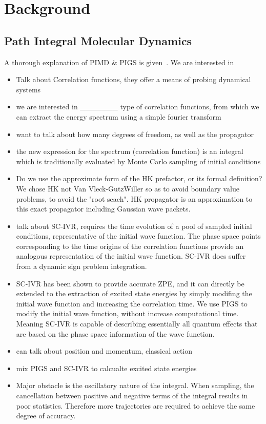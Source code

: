 \documentclass[12pt,letterpaper,oneside,final,titlepage]{article}               %
\numberwithin{equation}{section} %
\begin{document}
\section{Background}

\subsection*{Path Integral Molecular Dynamics}
A thorough explanation of PIMD $\&$ PIGS is given~\cite{iouchtchenko2014particle}. We are interested in 


\begin{itemize}
	\item Talk about Correlation functions, they offer a means of probing dynamical systems
	\item we are interested in \_\_\_\_\_\_\_ type of correlation functions, from which we can extract the energy spectrum using a simple fourier transform
	\item want to talk about how many degrees of freedom, as well as the propagator
	\item the new expression for the spectrum (correlation function) is an integral which is traditionally evaluated by Monte Carlo sampling of initial conditions
	\item Do we use the approximate form of the HK prefactor, or its formal definition? We chose HK not Van Vleck-GutzWiller so as to avoid boundary value problems, to avoid the "root seach". HK propagator is an approximation to this exact propagator including Gaussian wave packets.
	\item talk about SC-IVR, requires the time evolution of a pool of sampled initial conditions, representative of the initial wave function. The phase space points corresponding to the time origins of the correlation functions provide an analogous representation of the initial wave function. SC-IVR does suffer from a dynamic sign problem integration.
	\item SC-IVR has been shown to provide accurate ZPE, and it can directly be extended to the extraction of excited state energies by simply modifing the initial wave function and increasing the correlation time. We use PIGS to modify the initial wave function, without increase computational time. Meaning SC-IVR is capable of describing essentially all quantum effects that are based on the phase space information of the wave function.
	\item can talk about position and momentum, classical action
	\item mix PIGS and SC-IVR to calcualte excited state energies
	\item Major obstacle is the oscillatory nature of the integral. When sampling, the cancellation between positive and negative terms of the integral results in poor statistics. Therefore more trajectories are required to achieve the same degree of accuracy.
\end{itemize}
\end{document}
